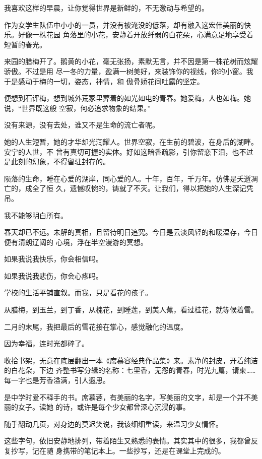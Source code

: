 \documentclass[12pt,a4paper]{article}
\begin{document}
		我喜欢这样的早晨，让你觉得世界是新鲜的，不无激动与希望的。

		作为女学生队伍中小小的一员，并没有被淹没的低落，却有融入这宏伟美丽的快乐。好像一株花园
	角落里的小花，安静着开放纤弱的白花朵，心满意足地享受着短暂的春光。

		来园的腊梅开了。鹅黄的小花，毫无张扬，素默无言，并不因是第一株花树而炫耀骄傲。不过是用
	尽一冬的力量，盈满一树美好，来装饰你的视线，你的小窗。我于是感动于梅的一切，姿态，神情，和
	傲骨娇花间吐露的坚定。

		便想到石评梅，想到城外荒冢里葬着的如光如电的青春。她爱梅，人也如梅。她说，“世界既这般
	空寂，何必追求物象的结果。”

		没有来源，没有去处，谁又不是生命的流亡者呢。

		她的人生短暂，她的才华却光润耀人。世界空寂，在生前的碧波，在身后的湖畔。安宁的人世，不
	曾有真切可握的实体。好如这暗香疏影，引你留恋下泪，也不过是此刻的幻象，不得留驻封存的。

		陨落的生命，睡在心爱的湖岸，同心爱的人。十年，百年，千万年。仿佛是夭逝凋亡的，成全了恒
	久，遗憾叹惋的，铸就了不灭。让我们，得以把她的人生深记凭吊。

		我不能够明白所有。

		春天却已不远。未解的真相，且留待明日追究。今日是云淡风轻的和暖温存，今日便有清朗辽阔的
	心境，浮在半空漫游的冥想。

		如果我说我快乐，你会相信吗。

		如果我说我悲伤，你会心疼吗。


		学校的生活平铺直叙。而我，只是看花的孩子。

		从腊梅，到玉兰，到丁香，从槐花，到睡莲，到美人蕉，看过桂花，就等候着雪。


		二月的末尾，我把最后的雪花接在掌心，感觉融化的温度。

		因为幸福，连时光都碎了。

	\endwriting



		收拾书架，无意在底层翻出一本《席慕容经典作品集》来。素净的封皮，开着纯洁的白花朵，下边
	齐整书写分辑的名称：七里香，无怨的青春，时光九篇，请柬…… 每一字也是芳香溢满，引人遐思。

		是中学时爱不释手的书。席慕蓉，有美丽的名字，写美丽的文字，却是一个并不美丽的女子。读她
	的诗，或许是每个少女都曾深心沉浸的事。

		随手翻动几页，对身边的莫迟笑说，我该细细重读，来温习少女情怀。

		这些字句，依旧安静地排列，带着陌生又熟悉的表情。其实其中的很多，我都曾反复抄写，记在随
	身携带的笔记本上。一些抄写，还是在课堂上完成的。
\end{document}
